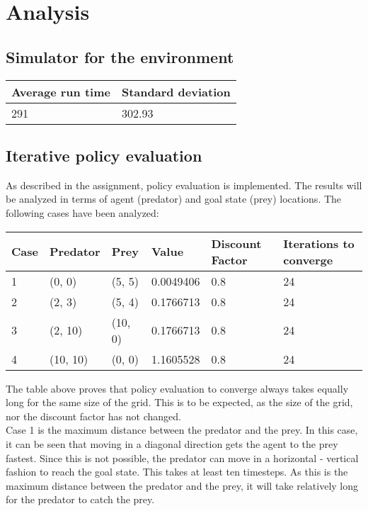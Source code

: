 \documentclass{article}
\begin{document}
\section*{Analysis}


\subsection*{Simulator for the environment}


\begin{center}
	\begin{tabular}{  l ||  l }
		Average run time & Standard deviation \\ 
		\hline
		291 &  302.93 %
	\end{tabular}
\end{center}

\subsection*{Iterative policy evaluation}
As described in the assignment, policy evaluation is implemented. The results will be analyzed in terms of agent (predator) and goal state (prey) locations. The following cases have been analyzed: 


\begin{center}
	\begin{tabular}{ |l | l | l | l | l | l| }
		Case & Predator & Prey & Value  & Discount Factor & Iterations to converge \\ 
		\hline
		1 & (0, 0) & (5, 5) & 0.0049406  & 0.8 & 24 \\
		2 & (2, 3) & (5, 4) & 0.1766713 & 0.8 & 24 \\
		3 & (2, 10) & (10, 0) & 0.1766713 & 0.8 & 24 \\
		4 & (10, 10) & (0, 0) & 1.1605528 & 0.8 & 24 \\	
	\end{tabular}
\end{center}

The table above proves that policy evaluation to converge always takes equally long for the same size of the grid. This is to be expected, as the size of the grid, nor the discount factor has not changed.\\

Case 1 is the maximum distance between the predator and the prey. In this case, it can be seen that moving in a diagonal direction gets the agent to the prey fastest. Since this is not possible, the predator can move in a horizontal - vertical fashion to reach the goal state. This takes at least ten timesteps. As this is the maximum distance between the predator and the prey, it will take relatively long for the predator to catch the prey. \\
\end{document}
